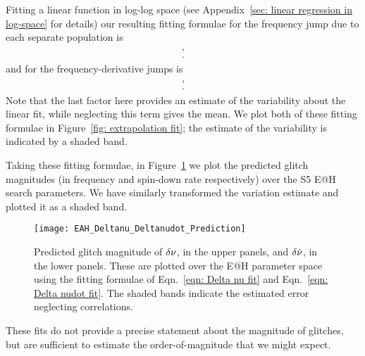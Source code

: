 \documentclass[../full_thesis/full_thesis.tex]{subfiles}
\newcommand{\thisdir}{../glitches_in_CGW}
\begin{document}
Fitting a linear function in log-log space (see Appendix~\ref{sec: linear regression in log-space} for details) our resulting fitting formulae for
the frequency jump due to each separate population is
\begin{align}
\begin{split}
,\\
.
\end{split}
\label{eqn: Delta nu fit}
\end{align}
and for the frequency-derivative jumps is
\begin{align}
\begin{split}
,\\
.
\end{split}
\label{eqn: Delta nudot fit}
\end{align}
Note that the last factor here provides
an estimate of the variability about the linear fit, while neglecting this term
gives the mean.
We plot both of these fitting formulae in Figure~\ref{fig: extrapolation fit};
the estimate of the variability is indicated by a shaded band.

Taking these fitting formulae, in Figure~\ref{fig: EAH Delta nu nudot prediction} we plot
the predicted glitch magnitudes (in frequency and spin-down rate respectively) over the 
S5 E@H search parameters. We have similarly
transformed the variation estimate and plotted it as a shaded band.
\begin{figure}[htb]
\centering
\texttt{[image: EAH\_Deltanu\_Deltanudot\_Prediction]}
\caption{Predicted glitch magnitude of $\delta\nu$, in the upper panels, and
$\delta\dot{\nu}$, in the lower panels. These are plotted over the E@H parameter
space using the fitting formulae of Eqn.~\eqref{eqn: Delta nu fit} and
Eqn.~\eqref{eqn: Delta nudot fit}. The shaded bands indicate the estimated error
neglecting correlations.}
\label{fig: EAH Delta nu nudot prediction}
\end{figure}
These fits do not provide a precise statement about the magnitude of glitches,
but are sufficient to estimate the order-of-magnitude that we might expect.
\end{document}
